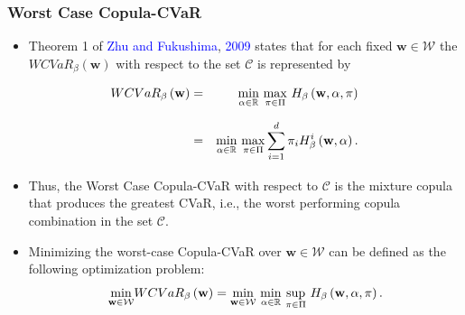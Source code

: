 \documentclass[pdf,10pt,xcolor=dvipsnames,hide notes]{beamer}
\begin{document}
\begin{frame}[label=frame3d]
	\frametitle{Worst Case Copula-CVaR}
	
	\begin{itemize}
		\justifying
		
		\item 	Theorem 1 of \textcolor{blue}{Zhu and Fukushima}, \textcolor{blue}{2009} states that for each
		fixed $\mathbf{w}\in \mathcal{W}$ the $WCVaR_{\beta }\left( \mathbf{w}%
		\right) $ with respect to the set $\mathcal{C}$ is represented by
		
	\end{itemize}
		\begin{eqnarray}
		WCVaR_{\beta }\left( \mathbf{w}\right) &=&\underset{}{\underset{\alpha \in
				\mathbb{R}
			}{\min }~\underset{\pi \in \Pi }{\max }}~H_{\beta }\left( \mathbf{w},\alpha
		,\pi \right)  \notag \\
		&=&\underset{}{\underset{\alpha \in
				\mathbb{R}
			}{\min }~\underset{\pi \in \Pi }{\max }}\sum_{i=1}^{d}\pi _{i}H_{\beta
		}^{i}\left( \mathbf{w},\alpha \right) .  \label{31}
		\end{eqnarray}%
		
		\begin{itemize}
			
			\item Thus, the Worst Case Copula-CVaR with respect to $\mathcal{C}$ is the
			mixture copula that produces the greatest CVaR, i.e., the worst performing
			copula combination in the set $\mathcal{C}$.
			
			\vspace{0.3cm}
			
			\item Minimizing the
			worst-case Copula-CVaR over $\mathbf{w}\in \mathcal{W}$ can be defined as
			the following optimization problem:%
			\begin{equation}
			\underset{\mathbf{w}\in \mathcal{W}}{\min }WCVaR_{\beta }\left( \mathbf{w}%
			\right) =\underset{}{\underset{\mathbf{w}\in \mathcal{W}}{\min }~\underset{%
					\alpha \in
					\mathbb{R}
				}{\min }~\underset{\pi \in \Pi }{\sup }}~H_{\beta }\left( \mathbf{w},\alpha
			,\pi \right) .  \label{32}
			\end{equation}%
			
					
	\end{itemize}
	

\end{frame}
\end{document}
